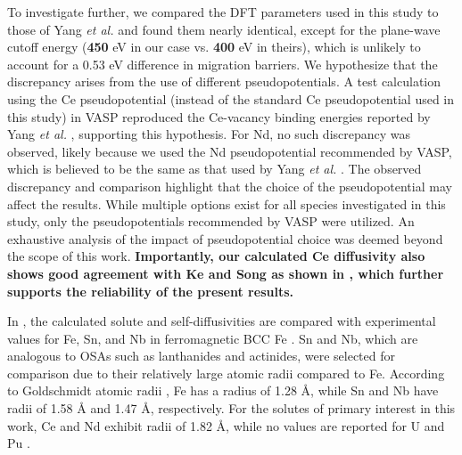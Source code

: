 \documentclass[preprint,12pt]{elsarticle}
\providecommand{\DIFaddtex}[1]{{\bf #1}} %
\providecommand{\DIFdeltex}[1]{} %
\providecommand{\DIFaddbegin}{\protect\color{blue}} %
\providecommand{\DIFaddend}{\protect\color{black}} %
\providecommand{\DIFdelbegin}{\protect\color{red}} %
\providecommand{\DIFdelend}{\protect\color{black}} %
\providecommand{\DIFadd}[1]{\texorpdfstring{\DIFaddtex{#1}}{#1}} %
\providecommand{\DIFdel}[1]{\texorpdfstring{\DIFdeltex{#1}}{}} %
\newcommand{\DIFscaledelfig}{0.5}
\newlength{\DIFdelgraphicswidth} %
\newlength{\DIFdelgraphicsheight} %
\newcommand{\DIFaddincludegraphics}[2][]{{\color{blue}\fbox{\DIFOincludegraphics[#1]{#2}}}} %
\newcommand{\DIFdelincludegraphics}[2][]{%
\sbox{\DIFdelgraphicsbox}{\DIFOincludegraphics[#1]{#2}}%
\settoboxwidth{\DIFdelgraphicswidth}{\DIFdelgraphicsbox} %
\settoboxtotalheight{\DIFdelgraphicsheight}{\DIFdelgraphicsbox} %
\scalebox{\DIFscaledelfig}{%
\parbox[b]{\DIFdelgraphicswidth}{\usebox{\DIFdelgraphicsbox}\\[-\baselineskip] \rule{\DIFdelgraphicswidth}{0em}}\llap{\resizebox{\DIFdelgraphicswidth}{\DIFdelgraphicsheight}{%
\setlength{\unitlength}{\DIFdelgraphicswidth}%
\begin{picture}(1,1)%
\thicklines\linethickness{2pt} %
{\color[rgb]{1,0,0}\put(0,0){\framebox(1,1){}}}%
{\color[rgb]{1,0,0}\put(0,0){\line( 1,1){1}}}%
{\color[rgb]{1,0,0}\put(0,1){\line(1,-1){1}}}%
\end{picture}%
}\hspace*{3pt}}} %
} %
\DeclareRobustCommand{\DIFaddbegin}{\DIFOaddbegin \let\includegraphics\DIFaddincludegraphics} %
\DeclareRobustCommand{\DIFaddend}{\DIFOaddend \let\includegraphics\DIFOincludegraphics} %
\DeclareRobustCommand{\DIFdelbegin}{\DIFOdelbegin \let\includegraphics\DIFdelincludegraphics} %
\DeclareRobustCommand{\DIFdelend}{\DIFOaddend \let\includegraphics\DIFOincludegraphics} %
\begin{document}
To investigate further, we compared the DFT parameters used in this study to those of Yang \textit{et al.} \cite{yang_significant_2023} and found them nearly identical, except for the plane-wave cutoff energy (\DIFdelbegin \DIFdel{400 }\DIFdelend \DIFaddbegin \DIFadd{450 }\DIFaddend eV in our case vs. \DIFdelbegin \DIFdel{450 }\DIFdelend \DIFaddbegin \DIFadd{400 }\DIFaddend eV in theirs), which is unlikely to account for a 0.53 eV difference in migration barriers. We hypothesize that the discrepancy arises from the use of different pseudopotentials. A test calculation using the Ce pseudopotential (instead of the standard Ce pseudopotential used in this study) in VASP reproduced the Ce-vacancy binding energies reported by Yang \textit{et al.} \cite{yang_significant_2023}, supporting this hypothesis. For Nd, no such discrepancy was observed, likely because we used the Nd pseudopotential recommended by VASP, which is believed to be the same as that used by Yang \textit{et al.} \cite{yang_significant_2023}. The observed discrepancy and comparison highlight that the choice of the pseudopotential may affect the results. While multiple options exist for all species investigated in this study, only the pseudopotentials recommended by VASP were utilized. An exhaustive analysis of the impact of pseudopotential choice was deemed beyond the scope of this work.
\DIFaddbegin \DIFadd{Importantly, our calculated Ce diffusivity also shows good agreement with Ke and Song \cite{ke2025diffusion} as shown in \Cref{tab:activation_energies}, which further supports the reliability of the present results.
}\DIFaddend 

In , the calculated solute and self-diffusivities are compared with experimental values for Fe, Sn, and Nb in ferromagnetic BCC Fe \cite{lubbehusen1990self, hettich1977self, torres2000diffusion, herzig2002niobium}. Sn and Nb, which are analogous to OSAs such as lanthanides and actinides, were selected for comparison due to their relatively large atomic radii compared to Fe. According to Goldschmidt atomic radii \cite{brandes2013smithells}, Fe has a radius of 1.28 Å, while Sn and Nb have radii of 1.58 Å and 1.47 Å, respectively. For the solutes of primary interest in this work, Ce and Nd exhibit radii of 1.82 Å, while no values are reported for U and Pu \cite{brandes2013smithells}.
\end{document}
